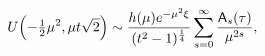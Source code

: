 \[\mathop{U\/}\nolimits\!\left(-\tfrac{1}{2}\mu^{2},\mu t\sqrt{2}\right)\sim%
\frac{h(\mu)e^{-\mu^{2}\xi}}{(t^{2}-1)^{\frac{1}{4}}}\sum_{s=0}^{\infty}\frac{%
\mathsf{A}_{s}(\tau)}{\mu^{2s}},\]